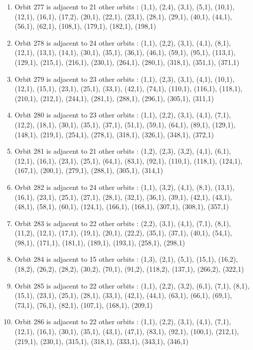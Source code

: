 \documentclass[12pt]{article}
\begin{document}
\begin{enumerate}
\item Orbit 277 is adjacent to 21 other orbits : (1,1), (2,4), (3,1), (5,1), (10,1), (12,1), (16,1), (17,2), (20,1), (22,1), (23,1), (28,1), (29,1), (40,1), (44,1), (56,1), (62,1), (108,1), (179,1), (182,1), (198,1)
\item Orbit 278 is adjacent to 24 other orbits : (1,1), (2,2), (3,1), (4,1), (8,1), (12,1), (13,1), (14,1), (30,1), (35,1), (36,1), (46,1), (59,1), (95,1), (113,1), (129,1), (215,1), (216,1), (230,1), (264,1), (280,1), (318,1), (351,1), (371,1)
\item Orbit 279 is adjacent to 23 other orbits : (1,1), (2,3), (3,1), (4,1), (10,1), (12,1), (15,1), (23,1), (25,1), (33,1), (42,1), (74,1), (110,1), (116,1), (118,1), (210,1), (212,1), (244,1), (281,1), (288,1), (296,1), (305,1), (311,1)
\item Orbit 280 is adjacent to 23 other orbits : (1,1), (2,2), (3,1), (4,1), (7,1), (12,2), (18,1), (30,1), (35,1), (37,1), (51,1), (59,1), (64,1), (89,1), (129,1), (148,1), (219,1), (254,1), (278,1), (318,1), (326,1), (348,1), (372,1)
\item Orbit 281 is adjacent to 21 other orbits : (1,2), (2,3), (3,2), (4,1), (6,1), (12,1), (16,1), (23,1), (25,1), (64,1), (83,1), (92,1), (110,1), (118,1), (124,1), (167,1), (200,1), (279,1), (288,1), (305,1), (314,1)
\item Orbit 282 is adjacent to 24 other orbits : (1,1), (3,2), (4,1), (8,1), (13,1), (16,1), (23,1), (25,1), (27,1), (28,1), (32,1), (36,1), (39,1), (42,1), (43,1), (48,1), (58,1), (60,1), (124,1), (166,1), (168,1), (307,1), (308,1), (357,1)
\item Orbit 283 is adjacent to 22 other orbits : (2,2), (3,1), (4,1), (7,1), (8,1), (11,2), (12,1), (17,1), (19,1), (20,1), (22,2), (35,1), (37,1), (40,1), (54,1), (98,1), (171,1), (181,1), (189,1), (193,1), (258,1), (298,1)
\item Orbit 284 is adjacent to 15 other orbits : (1,3), (2,1), (5,1), (15,1), (16,2), (18,2), (26,2), (28,2), (30,2), (70,1), (91,2), (118,2), (137,1), (266,2), (322,1)
\item Orbit 285 is adjacent to 22 other orbits : (1,1), (2,2), (3,2), (6,1), (7,1), (8,1), (15,1), (23,1), (25,1), (28,1), (33,1), (42,1), (44,1), (63,1), (66,1), (69,1), (73,1), (76,1), (82,1), (107,1), (168,1), (209,1)
\item Orbit 286 is adjacent to 22 other orbits : (1,1), (2,2), (3,1), (4,1), (7,1), (12,1), (16,1), (30,1), (35,1), (43,1), (47,1), (83,1), (92,1), (100,1), (212,1), (219,1), (230,1), (315,1), (318,1), (333,1), (343,1), (346,1)

\end{enumerate}
\end{document}
